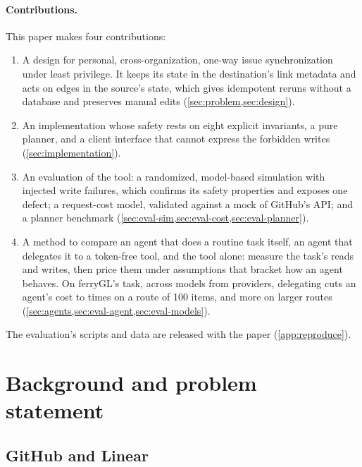 \documentclass[11pt,a4paper]{article}
\newcommand{\ferry}{ferryGL}
\begin{document}
\paragraph{Contributions.} This paper makes four contributions:
\begin{enumerate}[1.]
  \item A design for personal, cross-organization, one-way issue synchronization under least
    privilege. It keeps its state in the destination's link metadata and acts on edges in the
    source's state, which gives idempotent reruns without a database and preserves manual
    edits (\cref{sec:problem,sec:design}).
  \item An implementation whose safety rests on eight explicit invariants, a pure planner,
    and a client interface that cannot express the forbidden writes (\cref{sec:implementation}).
  \item An evaluation of the tool: a randomized, model-based simulation with injected write
    failures, which confirms its safety properties and exposes one defect; a request-cost
    model, validated against a mock of GitHub's API; and a planner benchmark
    (\cref{sec:eval-sim,sec:eval-cost,sec:eval-planner}).
  \item A method to compare an agent that does a routine task itself, an agent that delegates
    it to a token-free tool, and the tool alone: measure the task's reads and writes, then price
    them under assumptions that bracket how an agent behaves. On \ferry's task, across
    \CmpModels{} models from \CmpProviders{} providers, delegating cuts an agent's cost
    \CmpSavesMin{} to \CmpSavesMax{} times on a route of 100 items, and more on larger
    routes (\cref{sec:agents,sec:eval-agent,sec:eval-models}).
\end{enumerate}
The evaluation's scripts and data are released with the paper (\cref{app:reproduce}).

\section{Background and problem statement}
\label{sec:problem}

\subsection{GitHub and Linear}
\end{document}
